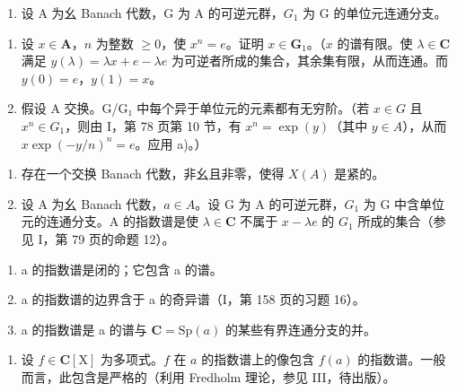 \begin{enumerate}
\def\labelenumi{\arabic{enumi})}
\setcounter{enumi}{2}
\tightlist
\item
  设 A 为幺 Banach 代数，G 为 A 的可逆元群，\(G_{1}\) 为 G 的单位元连通分支。
\end{enumerate}

\begin{enumerate}
\def\labelenumi{\alph{enumi})}
\item
  设 \(x \in \mathbf{A}\)，\(n\) 为整数 \(\geqslant 0\)，使 \(x^n = e\)。证明 \(x \in \mathbf{G}_1\)。（\(x\) 的谱有限。使 \(\lambda \in \mathbf{C}\) 满足 \(y(\lambda) = \lambda x + e - \lambda e\) 为可逆者所成的集合，其余集有限，从而连通。而 \(y(0) = e\)，\(y(1) = x\)。
\item
  假设 A 交换。G/G₁ 中每个异于单位元的元素都有无穷阶。（若 \(x \in G\) 且 \(x^n \in G_1\)，则由 I，第 78 页第 10 节，有 \(x^n = \exp(y)\)（其中 \(y \in A\)），从而 \(x \exp(-y/n)^n = e\)。应用 a)。）
\end{enumerate}

\begin{enumerate}
\def\labelenumi{\arabic{enumi})}
\setcounter{enumi}{3}
\item
  存在一个交换 Banach 代数，非幺且非零，使得 \(X(A)\) 是紧的。
\item
  设 A 为幺 Banach 代数，\(a \in A\)。设 G 为 A 的可逆元群，\(G_1\) 为 G 中含单位元的连通分支。A 的指数谱是使 \(\lambda \in \mathbf{C}\) 不属于 \(x - \lambda e\) 的 \(G_1\) 所成的集合（参见 I，第 79 页的命题 12）。
\end{enumerate}

\begin{enumerate}
\def\labelenumi{\alph{enumi})}
\item
  a 的指数谱是闭的；它包含 a 的谱。
\item
  a 的指数谱的边界含于 a 的奇异谱（I，第 158 页的习题 16）。
\item
  a 的指数谱是 a 的谱与 \(\mathbf{C}=\mathrm{Sp}(a)\) 的某些有界连通分支的并。
\end{enumerate}

\begin{enumerate}
\def\labelenumi{\alph{enumi})}
\setcounter{enumi}{3}
\tightlist
\item
  设 \(f\in \mathbf{C}[\mathrm{X}]\) 为多项式。\(f\) 在 \(a\) 的指数谱上的像包含 \(f(a)\) 的指数谱。一般而言，此包含是严格的（利用 Fredholm 理论，参见 III，待出版）。
\end{enumerate}

